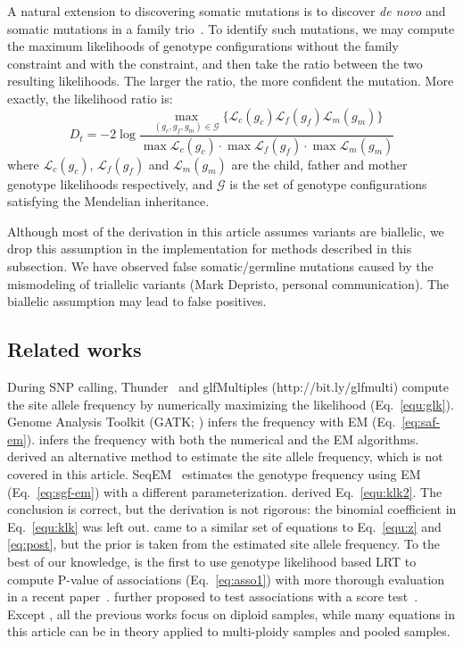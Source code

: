 \documentclass{bioinfo}
\begin{document}
\begin{methods}
A natural extension to discovering somatic mutations is to discover {\it de
novo} and somatic mutations in a family trio~\citep{Conrad:2011kx}.  To
identify such mutations, we may compute the maximum likelihoods of genotype
configurations without the family constraint and with the constraint, and then
take the ratio between the two resulting likelihoods. The larger the ratio, the
more confident the mutation. More exactly, the likelihood ratio is:
\begin{equation}\label{eq:dt}
D_t=-2\log\frac
{\max_{(g_c,g_f,g_m)\in\mathcal{G}}\{\mathcal{L}_c(g_c)\mathcal{L}_f(g_f)\mathcal{L}_m(g_m)\}}
{\max\mathcal{L}_c(g_c)\cdot\max\mathcal{L}_f(g_f)\cdot\max\mathcal{L}_m(g_m)}
\end{equation}
where $\mathcal{L}_c(g_c)$, $\mathcal{L}_f(g_f)$ and $\mathcal{L}_m(g_m)$
are the child, father and mother genotype likelihoods respectively, and
$\mathcal{G}$ is the set of genotype configurations satisfying the Mendelian
inheritance.

Although most of the derivation in this article assumes variants are biallelic,
we drop this assumption in the implementation for methods described in this subsection.  We have
observed false somatic/germline mutations caused by the mismodeling of
triallelic variants (Mark Depristo, personal communication). The biallelic
assumption may lead to false positives.

\subsection{Related works}
During SNP calling, Thunder~\citep{Li:2011fk} and glfMultiples
(http://bit.ly/glfmulti) compute the site allele frequency by numerically
maximizing the likelihood (Eq.~\ref{equ:glk}). Genome Analysis Toolkit (GATK;
\citealp{Depristo:2011vn}) infers the frequency with EM (Eq.~\ref{eq:saf-em}).
\citet{Kim:2011fk} infers the frequency with both the numerical and the EM
algorithms.  \citet{Li:2010ys} derived an alternative method to estimate the
site allele frequency, which is not covered in this article.
SeqEM~\citep{Martin:2010dz} estimates the genotype frequency using EM
(Eq.~\ref{eq:sgf-em}) with a different parameterization.  \citet{Le:2010uq}
derived Eq.~\eqref{equ:klk2}. The conclusion is correct, but the derivation is
not rigorous: the binomial coefficient in Eq.~\eqref{equ:klk} was left out.
\citet{Yi:2010zr} came to a similar set of equations to Eq.~\eqref{equ:z} and
\eqref{eq:post}, but the prior is taken from the estimated site allele
frequency.  To the best of our knowledge, \citet{Kim:2010ve} is the first to
use genotype likelihood based LRT to compute P-value of associations
(Eq.~\ref{eq:asso1}) with more thorough evaluation in a recent
paper~\citep{Kim:2011fk}. \citet{Nielsen:2011fk} further proposed to test
associations with a score test~\citep{Schaid:2002qf}.  Except
\citet{Kim:2010ve}, all the previous works focus on diploid samples, while many
equations in this article can be in theory applied to multi-ploidy samples and
pooled samples.


\end{methods}
\end{document}
